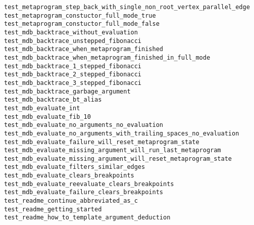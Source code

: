 \begin{description}
    \item[\texttt{test\_metaprogram\_step\_back\_with\_single\_non\_root\_vertex\_parallel\_edge}]
    \item[\texttt{test\_metaprogram\_constuctor\_full\_mode\_true}]
    \item[\texttt{test\_metaprogram\_constuctor\_full\_mode\_false}]
    \item[\texttt{test\_mdb\_backtrace\_without\_evaluation}]
    \item[\texttt{test\_mdb\_backtrace\_unstepped\_fibonacci}]
    \item[\texttt{test\_mdb\_backtrace\_when\_metaprogram\_finished}]
    \item[\texttt{test\_mdb\_backtrace\_when\_metaprogram\_finished\_in\_full\_mode}]
    \item[\texttt{test\_mdb\_backtrace\_1\_stepped\_fibonacci}]
    \item[\texttt{test\_mdb\_backtrace\_2\_stepped\_fibonacci}]
    \item[\texttt{test\_mdb\_backtrace\_3\_stepped\_fibonacci}]
    \item[\texttt{test\_mdb\_backtrace\_garbage\_argument}]
    \item[\texttt{test\_mdb\_backtrace\_bt\_alias}]
    \item[\texttt{test\_mdb\_evaluate\_int}]
    \item[\texttt{test\_mdb\_evaluate\_fib\_10}]
    \item[\texttt{test\_mdb\_evaluate\_no\_arguments\_no\_evaluation}]
    \item[\texttt{test\_mdb\_evaluate\_no\_arguments\_with\_trailing\_spaces\_no\_evaluation}]
    \item[\texttt{test\_mdb\_evaluate\_failure\_will\_reset\_metaprogram\_state}]
    \item[\texttt{test\_mdb\_evaluate\_missing\_argument\_will\_run\_last\_metaprogram}]
    \item[\texttt{test\_mdb\_evaluate\_missing\_argument\_will\_reset\_metaprogram\_state}]
    \item[\texttt{test\_mdb\_evaluate\_filters\_similar\_edges}]
    \item[\texttt{test\_mdb\_evaluate\_clears\_breakpoints}]
    \item[\texttt{test\_mdb\_evaluate\_reevaluate\_clears\_breakpoints}]
    \item[\texttt{test\_mdb\_evaluate\_failure\_clears\_breakpoints}]
    \item[\texttt{test\_readme\_continue\_abbreviated\_as\_c}]
    \item[\texttt{test\_readme\_getting\_started}]
    \item[\texttt{test\_readme\_how\_to\_template\_argument\_deduction}]
\end{description}

